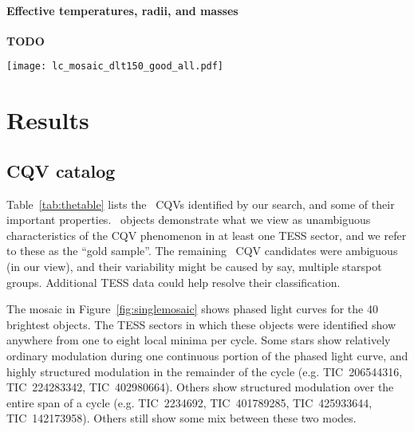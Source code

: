 \documentclass[11pt,twocolumn,tighten]{aastex63}
\begin{document}
\paragraph{Effective temperatures, radii, and masses}
{\bf TODO}


\begin{figure*}[!t]
	\begin{center}
		\centering
		\texttt{[image: lc\_mosaic\_dlt150\_good\_all.pdf]}
		\caption{
			{\bf CQVs from a search of the TESS 2-minute data at
				$d$$<$150\,pc, acquired between July~2018 and Sep~2022.}
			Phased TESS light curves over 1 month are shown for 40 CQVs;
			they include the brightest and closest examples of CQVs known
			($V$=14; $J$=9.5; $d$=25\,pc).  Gray are raw 2-minute data;
			black bins to 300 points per cycle.  Periods in hours are listed
			in the lower right corners of each panel.
			{\bf todo:  add TIC IDs and sector numbers}.
		}
		\label{fig:singlemosaic}
	\end{center}
\end{figure*}


\section{Results}
\label{sec:results}

\subsection{CQV catalog}

Table~\ref{tab:thetable} lists the \ncpvsfound\ CQVs identified by our
search, and some of their important properties.  \ngoods\ objects
demonstrate what we view as unambiguous characteristics of the CQV
phenomenon in at least one TESS sector, and we refer to these as the
``gold sample''.  The remaining \nmaybes\ CQV candidates were
ambiguous (in our view), and their variability might be caused by say,
multiple starspot groups.  Additional TESS data could help resolve
their classification.

The mosaic in Figure~\ref{fig:singlemosaic} shows phased light curves
for the 40 brightest objects.  The TESS sectors in which these objects
were identified show anywhere from one to eight local minima per
cycle.  Some stars show relatively ordinary modulation during one
continuous portion of the phased light curve, and highly structured
modulation in the remainder of the cycle (e.g. TIC~206544316,
TIC~224283342, TIC~402980664).  Others show structured modulation over
the entire span of a cycle (e.g. TIC~2234692, TIC~401789285,
TIC~425933644, TIC~142173958).  Others still show some mix between
these two modes.
\end{document}
